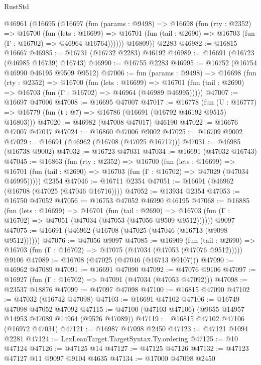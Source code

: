 \begin{lexlean}{RustStd}
\begin{coremodule}
    @46961
      (@16695
        (@16697
          (fun (params : @9498) =>
          @16698
            (fun (rty : @2352) =>
            @16700
              (fun (lets : @16699) =>
              @16701 (fun (tail : @2690) => @16703 (fun (Γ : @16702) => @46964 @16764))))))
        @16809))
    @2283
@46982 := @16815 @16667
@46985 := @16731 (@16732 @2283) @46192
@46989 := @16691 (@16723 (@46985 @16739) @16743)
@46990 := @16755 @2283
@46995 := @16752 (@16754 @46990 @46195 @9509 @9512)
@47006 := fun (params : @9498) =>
  @16698
    (fun (rty : @2352) =>
    @16700
      (fun (lets : @16699) =>
      @16701 (fun (tail : @2690) => @16703 (fun (Γ : @16702) => @46964 (@46989 @46995)))))
@47007 := @16697 @47006
@47008 := @16695 @47007
@47017 := @16778
    (fun (U : @16777) => @16779 (fun (t : @7) => @16786 (@16691 (@16792 @46192 @9515) @16803)))
@47020 := @46982 (@47008 @47017) @46190
@47022 := @16676 @47007 @47017
@47024 := @16860 @47006 @9002
@47025 := @16709 @9002
@47029 := @16691 (@46962 (@16708 (@47025 @16717)))
@47031 := @46985 (@16738 @9002)
@47032 := @16723 @47031
@47034 := @16691 (@47032 @16743)
@47045 := @16863
    (fun (rty : @2352) =>
    @16700
      (fun (lets : @16699) =>
      @16701 (fun (tail : @2690) => @16703 (fun (Γ : @16702) => @47029 (@47034 @46995)))))
    @2354
@47046 := @16711 @2354
@47051 := @16691 (@46962 (@16708 (@47025 (@47046 @16716))))
@47052 := @13934 @2354
@47053 := @16750 @47052
@47056 := @16753 @47052 @46990 @46195
@47068 := @16885
    (fun (lets : @16699) =>
    @16701
      (fun (tail : @2690) =>
      @16703 (fun (Γ : @16702) => @47051 (@47034 (@47053 (@47056 @9509 @9512))))))
    @9097
@47075 := @16691 (@46962 (@16708 (@47025 (@47046 (@16713 (@9098 @9512))))))
@47076 := @47056 @9097
@47085 := @16909
    (fun (tail : @2690) => @16703 (fun (Γ : @16702) => @47075 (@47034 (@47053 (@47076 @9512)))))
    @9106
@47089 := @16708 (@47025 (@47046 (@16713 @9107)))
@47090 := @46962 @47089
@47091 := @16691 @47090
@47092 := @47076 @9106
@47097 := @16927 (fun (Γ : @16702) => @47091 (@47034 (@47053 @47092)))
@47098 := @23537 @18876
@47099 := @47097 @47098
@47100 := @16815 @47090
@47102 := @47032 (@16742 @47098)
@47103 := @16691 @47102
@47106 := @16749 @47098 @47052 @47092
@47115 := @47100 (@47103 @47106) (@9655 @14957 @14953 @47089 @14964 (@9526 @47089))
@47119 := @16815 @47102 @47106 (@16972 @47031)
@47121 := @16987 @47098 @2450
@47123 := @47121 @1094 @2281
@47124 := LexLeanTarget.TargetSyntax.Ty.ordering
@47125 := @10 @47124
@47126 := @47125 @14
@47127 := @47125 @47126
@47132 := @47123 @47127 @11 @9097 @9104 @4635
@47134 := @17000 @47098 @2450

\end{coremodule}
\end{lexlean}
